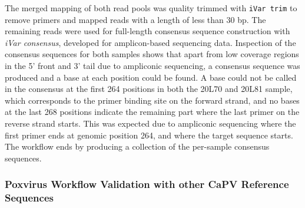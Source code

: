 The merged mapping of both read pools was quality trimmed with \texttt{iVar trim} to remove primers and mapped reads with a length of less than 30 bp. The remaining reads were used for full-length consensus sequence construction with \textit{iVar consensus}, developed for amplicon-based sequencing data. Inspection of the consensus sequences for both samples shows that apart from low coverage regions in the 5' front and 3' tail due to ampliconic sequencing, a consensus sequence was produced and a base at each position could be found. A base could not be called in the consensus at the first 264 positions in both the 20L70 and 20L81 sample, which corresponds to the primer binding site on the forward strand, and no bases at the last 268 positions indicate the remaining part where the last primer on the reverse strand starts. This was expected due to ampliconic sequencing where the first primer ends at genomic position 264, and where the target sequence starts. The workflow ends by producing a collection of the per-sample consensus sequences.

\subsubsection*{Poxvirus Workflow Validation with other CaPV Reference Sequences}

